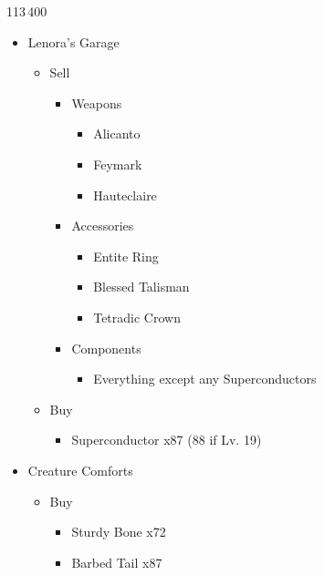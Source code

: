 \begin{paracol}{2}
	\begin{shop}{113\,400}
		\begin{itemize}
			\item Lenora's Garage
			      \begin{itemize}
				      \item Sell
				            \begin{itemize}
					            \item Weapons
					                  \begin{itemize}
						                  \item Alicanto
						                  \item Feymark
						                  \item Hauteclaire
					                  \end{itemize}
					            \item Accessories
					                  \begin{itemize}
						                  \item Entite Ring
						                  \item Blessed Talisman
						                  \item Tetradic Crown
					                  \end{itemize}
					            \item Components
					                  \begin{itemize}
						                  \item Everything except any Superconductors
					                  \end{itemize}
				            \end{itemize}
				      \item Buy
				            \begin{itemize}
					            \item Superconductor x87 (88 if Lv. 19)
				            \end{itemize}
			      \end{itemize}
			\item Creature Comforts
			      \begin{itemize}
				      \item Buy
				            \begin{itemize}
					            \item Sturdy Bone x72
					            \item Barbed Tail x87
				            \end{itemize}
			      \end{itemize}

\end{itemize}
\end{shop}
\end{paracol}
